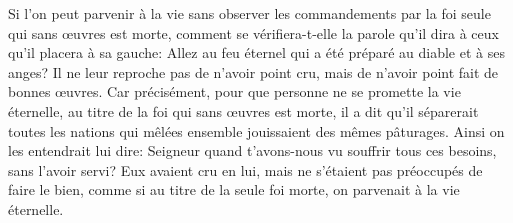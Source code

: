 Si l’on peut parvenir à la vie sans observer les commandements
	par la foi seule qui sans œuvres est morte,
	comment se vérifiera-t-elle
		la parole qu’il dira à ceux qu’il placera à sa gauche:
	Allez au feu éternel qui a été préparé au diable et à ses anges?
Il ne leur reproche pas de n’avoir point cru,
	mais de n’avoir point fait de bonnes œuvres.
Car précisément, pour que personne ne se promette la vie éternelle,
	au titre de la foi qui sans œuvres est morte,
	il a dit qu’il séparerait toutes les nations
	qui mêlées ensemble jouissaient des mêmes pâturages.
Ainsi on les entendrait lui dire:
	Seigneur quand t’avons-nous vu souffrir tous ces besoins,
		sans l’avoir servi?
	Eux avaient cru en lui, mais ne s’étaient pas préoccupés de faire le bien,
	comme si au titre de la seule foi morte, on parvenait à la vie éternelle.

